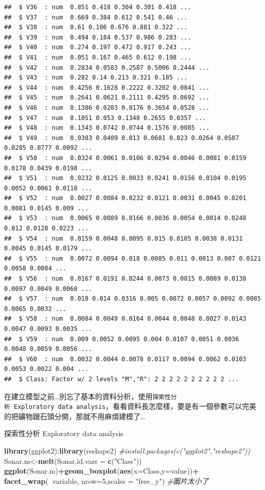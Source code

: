 \documentclass[
]{book}
\newenvironment{Shaded}{\begin{snugshade}}{\end{snugshade}}
\newcommand{\CommentTok}[1]{\textcolor[rgb]{0.56,0.35,0.01}{\textit{#1}}}
\newcommand{\DataTypeTok}[1]{\textcolor[rgb]{0.13,0.29,0.53}{#1}}
\newcommand{\DecValTok}[1]{\textcolor[rgb]{0.00,0.00,0.81}{#1}}
\newcommand{\KeywordTok}[1]{\textcolor[rgb]{0.13,0.29,0.53}{\textbf{#1}}}
\newcommand{\NormalTok}[1]{#1}
\newcommand{\OperatorTok}[1]{\textcolor[rgb]{0.81,0.36,0.00}{\textbf{#1}}}
\newcommand{\StringTok}[1]{\textcolor[rgb]{0.31,0.60,0.02}{#1}}
\begin{document}
\begin{verbatim}
##  $ V36  : num  0.851 0.418 0.304 0.301 0.418 ...
##  $ V37  : num  0.669 0.384 0.612 0.541 0.46 ...
##  $ V38  : num  0.61 0.106 0.676 0.881 0.322 ...
##  $ V39  : num  0.494 0.184 0.537 0.986 0.283 ...
##  $ V40  : num  0.274 0.197 0.472 0.917 0.243 ...
##  $ V41  : num  0.051 0.167 0.465 0.612 0.198 ...
##  $ V42  : num  0.2834 0.0583 0.2587 0.5006 0.2444 ...
##  $ V43  : num  0.282 0.14 0.213 0.321 0.185 ...
##  $ V44  : num  0.4256 0.1628 0.2222 0.3202 0.0841 ...
##  $ V45  : num  0.2641 0.0621 0.2111 0.4295 0.0692 ...
##  $ V46  : num  0.1386 0.0203 0.0176 0.3654 0.0528 ...
##  $ V47  : num  0.1051 0.053 0.1348 0.2655 0.0357 ...
##  $ V48  : num  0.1343 0.0742 0.0744 0.1576 0.0085 ...
##  $ V49  : num  0.0383 0.0409 0.013 0.0681 0.023 0.0264 0.0507 0.0285 0.0777 0.0092 ...
##  $ V50  : num  0.0324 0.0061 0.0106 0.0294 0.0046 0.0081 0.0159 0.0178 0.0439 0.0198 ...
##  $ V51  : num  0.0232 0.0125 0.0033 0.0241 0.0156 0.0104 0.0195 0.0052 0.0061 0.0118 ...
##  $ V52  : num  0.0027 0.0084 0.0232 0.0121 0.0031 0.0045 0.0201 0.0081 0.0145 0.009 ...
##  $ V53  : num  0.0065 0.0089 0.0166 0.0036 0.0054 0.0014 0.0248 0.012 0.0128 0.0223 ...
##  $ V54  : num  0.0159 0.0048 0.0095 0.015 0.0105 0.0038 0.0131 0.0045 0.0145 0.0179 ...
##  $ V55  : num  0.0072 0.0094 0.018 0.0085 0.011 0.0013 0.007 0.0121 0.0058 0.0084 ...
##  $ V56  : num  0.0167 0.0191 0.0244 0.0073 0.0015 0.0089 0.0138 0.0097 0.0049 0.0068 ...
##  $ V57  : num  0.018 0.014 0.0316 0.005 0.0072 0.0057 0.0092 0.0085 0.0065 0.0032 ...
##  $ V58  : num  0.0084 0.0049 0.0164 0.0044 0.0048 0.0027 0.0143 0.0047 0.0093 0.0035 ...
##  $ V59  : num  0.009 0.0052 0.0095 0.004 0.0107 0.0051 0.0036 0.0048 0.0059 0.0056 ...
##  $ V60  : num  0.0032 0.0044 0.0078 0.0117 0.0094 0.0062 0.0103 0.0053 0.0022 0.004 ...
##  $ Class: Factor w/ 2 levels "M","R": 2 2 2 2 2 2 2 2 2 2 ...
\end{verbatim}

在建立模型之前\ldots 別忘了基本的資料分析，使用\texttt{探索性分析\ Exploratory\ data\ analysis}，看看資料長怎麼樣，要是有一個參數可以完美的把礦物跟石頭分開，那就不用麻煩建模了\ldots{}

探索性分析 Exploratory data analysis

\begin{Shaded}
\begin{Highlighting}[]
\KeywordTok{library}\NormalTok{(ggplot2);}\KeywordTok{library}\NormalTok{(reshape2) }\CommentTok{#install.packages(c("ggplot2","reshape2"))}
\NormalTok{Sonar.m<-}\KeywordTok{melt}\NormalTok{(Sonar,}\DataTypeTok{id.vars =} \KeywordTok{c}\NormalTok{(}\StringTok{"Class"}\NormalTok{))}
\KeywordTok{ggplot}\NormalTok{(Sonar.m)}\OperatorTok{+}\KeywordTok{geom_boxplot}\NormalTok{(}\KeywordTok{aes}\NormalTok{(}\DataTypeTok{x=}\NormalTok{Class,}\DataTypeTok{y=}\NormalTok{value))}\OperatorTok{+}
\StringTok{    }\KeywordTok{facet_wrap}\NormalTok{(}\OperatorTok{~}\NormalTok{variable, }\DataTypeTok{nrow=}\DecValTok{5}\NormalTok{,}\DataTypeTok{scales =} \StringTok{"free_y"}\NormalTok{) }\CommentTok{#圖片太小了}
\end{Highlighting}
\end{Shaded}
\end{document}
